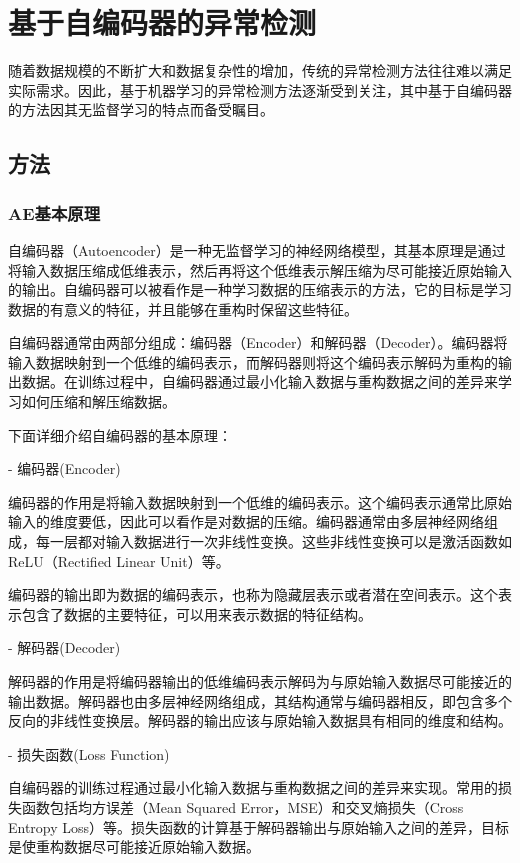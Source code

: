 \section{基于自编码器的异常检测}

随着数据规模的不断扩大和数据复杂性的增加，传统的异常检测方法往往难以满足实际需求。因此，基于机器学习的异常检测方法逐渐受到关注，其中基于自编码器的方法因其无监督学习的特点而备受瞩目。

\subsection{方法}

\subsubsection{AE基本原理}

自编码器（Autoencoder）是一种无监督学习的神经网络模型，其基本原理是通过将输入数据压缩成低维表示，然后再将这个低维表示解压缩为尽可能接近原始输入的输出。自编码器可以被看作是一种学习数据的压缩表示的方法，它的目标是学习数据的有意义的特征，并且能够在重构时保留这些特征。

自编码器通常由两部分组成：编码器（Encoder）和解码器（Decoder）。编码器将输入数据映射到一个低维的编码表示，而解码器则将这个编码表示解码为重构的输出数据。在训练过程中，自编码器通过最小化输入数据与重构数据之间的差异来学习如何压缩和解压缩数据。

下面详细介绍自编码器的基本原理：

- 编码器(Encoder)

编码器的作用是将输入数据映射到一个低维的编码表示。这个编码表示通常比原始输入的维度要低，因此可以看作是对数据的压缩。编码器通常由多层神经网络组成，每一层都对输入数据进行一次非线性变换。这些非线性变换可以是激活函数如ReLU（Rectified Linear Unit）等。

编码器的输出即为数据的编码表示，也称为隐藏层表示或者潜在空间表示。这个表示包含了数据的主要特征，可以用来表示数据的特征结构。

- 解码器(Decoder)

解码器的作用是将编码器输出的低维编码表示解码为与原始输入数据尽可能接近的输出数据。解码器也由多层神经网络组成，其结构通常与编码器相反，即包含多个反向的非线性变换层。解码器的输出应该与原始输入数据具有相同的维度和结构。

- 损失函数(Loss Function)

自编码器的训练过程通过最小化输入数据与重构数据之间的差异来实现。常用的损失函数包括均方误差（Mean Squared Error，MSE）和交叉熵损失（Cross Entropy Loss）等。损失函数的计算基于解码器输出与原始输入之间的差异，目标是使重构数据尽可能接近原始输入数据。

